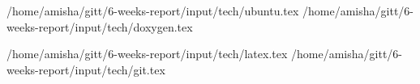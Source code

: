
 {/home/amisha/gitt/6-weeks-report/input/tech/ubuntu.tex}
 {/home/amisha/gitt/6-weeks-report/input/tech/doxygen.tex}

 {/home/amisha/gitt/6-weeks-report/input/tech/latex.tex}
 {/home/amisha/gitt/6-weeks-report/input/tech/git.tex}



